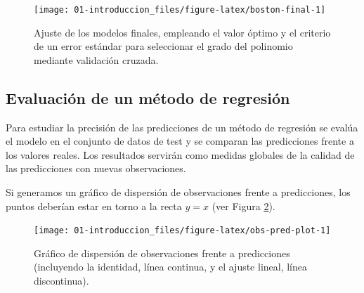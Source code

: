 \documentclass[
  spanish,
]{book}
\newenvironment{Shaded}{\begin{snugshade}}{\end{snugshade}}
\newcommand{\AttributeTok}[1]{\textcolor[rgb]{0.77,0.63,0.00}{#1}}
\newcommand{\CommentTok}[1]{\textcolor[rgb]{0.56,0.35,0.01}{\textit{#1}}}
\newcommand{\DecValTok}[1]{\textcolor[rgb]{0.00,0.00,0.81}{#1}}
\newcommand{\FunctionTok}[1]{\textcolor[rgb]{0.00,0.00,0.00}{#1}}
\newcommand{\NormalTok}[1]{#1}
\newcommand{\OtherTok}[1]{\textcolor[rgb]{0.56,0.35,0.01}{#1}}
\newcommand{\SpecialCharTok}[1]{\textcolor[rgb]{0.00,0.00,0.00}{#1}}
\newcommand{\StringTok}[1]{\textcolor[rgb]{0.31,0.60,0.02}{#1}}
\theoremstyle{break}
\theoremstyle{definition}
\theoremstyle{definition}
\theoremstyle{definition}
\theoremstyle{definition}
\theoremstyle{remark}
\begin{document}
\begin{figure}[!htb]

{\centering \texttt{[image: 01-introduccion\_files/figure-latex/boston-final-1]} 

}

\caption{Ajuste de los modelos finales, empleando el valor óptimo y el criterio de un error estándar para seleccionar el grado del polinomio mediante validación cruzada.}\label{fig:boston-final}
\end{figure}

\hypertarget{eval-reg}{%
\subsection{Evaluación de un método de regresión}\label{eval-reg}}

Para estudiar la precisión de las predicciones de un método de regresión se evalúa el
modelo en el conjunto de datos de test y se comparan las predicciones frente a los valores reales.
Los resultados servirán como medidas globales de la calidad de las predicciones con nuevas observaciones.

Si generamos un gráfico de dispersión de observaciones frente a predicciones, los puntos deberían estar en torno a la recta \(y=x\) (ver Figura \ref{fig:obs-pred-plot}).

\begin{Shaded}
\end{Shaded}

\begin{figure}[!htb]

{\centering \texttt{[image: 01-introduccion\_files/figure-latex/obs-pred-plot-1]} 

}

\caption{Gráfico de dispersión de observaciones frente a predicciones (incluyendo la identidad, línea continua, y el ajuste lineal, línea discontinua).}\label{fig:obs-pred-plot}
\end{figure}
\end{document}
